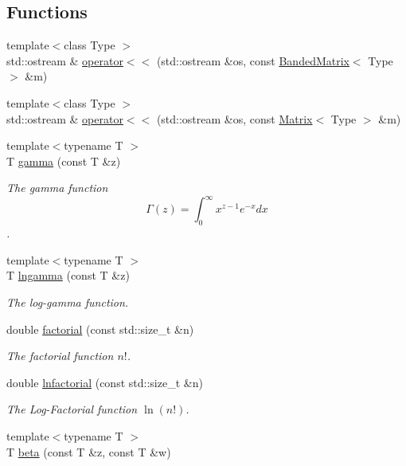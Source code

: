 \subsection*{Functions}
\begin{DoxyCompactItemize}
\item 
{\footnotesize template$<$class Type $>$ }\\std\+::ostream \& \hyperlink{namespaceLuna_ac5771a779e9fac8d1f586a9046f82761}{operator$<$$<$} (std\+::ostream \&os, const \hyperlink{classLuna_1_1BandedMatrix}{Banded\+Matrix}$<$ Type $>$ \&m)
\item 
{\footnotesize template$<$class Type $>$ }\\std\+::ostream \& \hyperlink{namespaceLuna_af2f7e56c33c9d269a0120294c4c37d24}{operator$<$$<$} (std\+::ostream \&os, const \hyperlink{classLuna_1_1Matrix}{Matrix}$<$ Type $>$ \&m)
\item 
{\footnotesize template$<$typename T $>$ }\\T \hyperlink{namespaceLuna_a4467788060a97debe131fa8f08a00de3}{gamma} (const T \&z)
\begin{DoxyCompactList}\small\item\em The gamma function \[ \Gamma(z) = \int_0^{\infty} x^{z-1}e^{-x} dx \]. \end{DoxyCompactList}\item 
{\footnotesize template$<$typename T $>$ }\\T \hyperlink{namespaceLuna_a5682d79a57f8eb7e6c08654af8955d4c}{lngamma} (const T \&z)
\begin{DoxyCompactList}\small\item\em The log-\/gamma function. \end{DoxyCompactList}\item 
double \hyperlink{namespaceLuna_a62f1af647be5ca8909ba79911afede93}{factorial} (const std\+::size\+\_\+t \&n)
\begin{DoxyCompactList}\small\item\em The factorial function $ n! $. \end{DoxyCompactList}\item 
double \hyperlink{namespaceLuna_af55fcfd16fe0fd817853f43623de1ea5}{lnfactorial} (const std\+::size\+\_\+t \&n)
\begin{DoxyCompactList}\small\item\em The Log-\/\+Factorial function $ \ln(n!) $. \end{DoxyCompactList}\item 
{\footnotesize template$<$typename T $>$ }\\T \hyperlink{namespaceLuna_af542f1c7522ca96017105e160b54df80}{beta} (const T \&z, const T \&w)

\end{DoxyCompactItemize}

